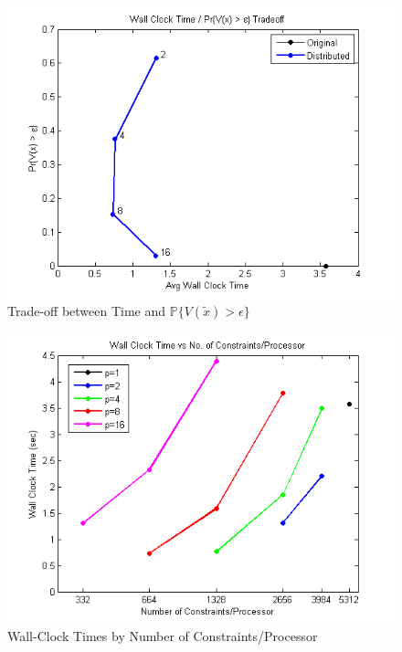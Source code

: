 \documentclass[12pt]{article}
\begin{document}
\begin{figure}[ht]
	\centering
		\includegraphics{../plot/figs/wct_probviolprobgreateps_frontier.png}
	\caption{Trade-off between Time and $\mathbb{P}\{V(\tilde{x}) > \epsilon \}$}
	\label{fig:wct_probviolprobgreateps_frontier}
\end{figure}

\begin{figure}[ht]
	\centering
		\includegraphics{../plot/figs/wct_numconstraint.png}
	\caption{Wall-Clock Times by Number of Constraints/Processor}
	\label{fig:wct_numconstraint}
\end{figure}
\end{document}

